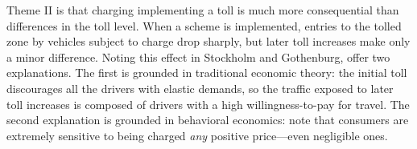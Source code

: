 Theme II is that charging implementing a toll is much more consequential than differences in the toll level. When a scheme is implemented, entries to the tolled zone by vehicles subject to charge drop sharply, but later toll increases make only a minor difference. Noting this effect in Stockholm and Gothenburg, \citet[p. 45]{Borjesson2018} offer two explanations. The first is grounded in traditional economic theory: the initial toll discourages all the drivers with elastic demands, so the traffic exposed to later toll increases is composed of drivers with a high willingness-to-pay for travel. The second explanation is grounded in behavioral economics: \citet{Shampanier2007} note that consumers are extremely sensitive to being charged \emph{any} positive price---even negligible ones.

